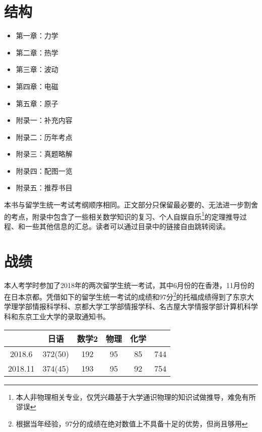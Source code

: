 \section*{结构}
\begin{multicols}{2}
    \begin{itemize}
        \item 第一章：力学
        \item 第二章：热学
        \item 第三章：波动
        \item 第四章：电磁
        \item 第五章：原子
        \item 附录一：补充内容
        \item 附录二：历年考点
        \item 附录三：真题略解
        \item 附录四：配图一览
        \item 附录五：推荐书目
    \end{itemize}
\end{multicols}
本书与留学生统一考试考纲顺序相同。正文部分只保留最必要的、无法进一步割舍的考点，附录中包含了一些相关数学知识的复习、个人自娱自乐\footnote{本人非物理相关专业，仅凭兴趣基于大学通识物理的知识试做推导，难免有所谬误}的定理推导过程、和一些其他信息的汇总。读者可以通过目录中的链接自由跳转阅读。

\section*{战绩}
本人考学时参加了2018年的两次留学生统一考试，其中6月份的在香港，11月份的在日本京都。凭借如下的留学生统一考试的成绩和97分\footnote{根据当年经验，97分的成绩在绝对数值上不具备十足的优势，但尚且够用}的托福成绩得到了东京大学理学部情报科学科、京都大学工学部情报学科、名古屋大学情报学部计算机科学科和东京工业大学的录取通知书。
\begin{center}
    \renewcommand\arraystretch{1.2}
    \begin{tabular}{c|cccc|c}
        \hline
        &日语&数学2&物理&化学&\\\hline
        2018.6&372(50)&192&95&85&744\\
        2018.11&374(45)&193&95&92&754\\
        \hline
    \end{tabular}
\end{center}


\clearpage
\renewcommand{\contentsname}{目录}
\tableofcontents
